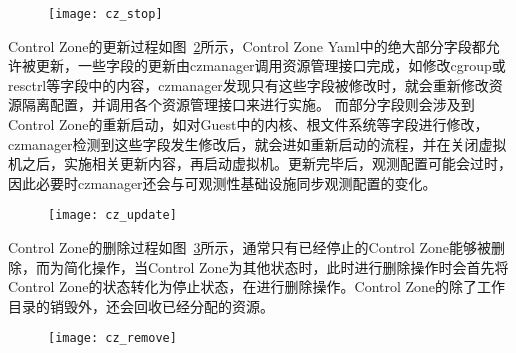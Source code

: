 \begin{figure}[!htbp]
    \centering
    \texttt{[image: cz\_stop]}
    \label{fig:cz_stop}
\end{figure}

Control Zone的更新过程如图~\ref{fig:cz_update}所示，Control Zone Yaml中的绝大部分字段都允许被更新，一些字段的更新由czmanager调用资源管理接口完成，如修改cgroup或resctrl等字段中的内容，czmanager发现只有这些字段被修改时，就会重新修改资源隔离配置，并调用各个资源管理接口来进行实施。 而部分字段则会涉及到Control Zone的重新启动，如对Guest中的内核、根文件系统等字段进行修改，czmanager检测到这些字段发生修改后，就会进如重新启动的流程，并在关闭虚拟机之后，实施相关更新内容，再启动虚拟机。更新完毕后，观测配置可能会过时，因此必要时czmanager还会与可观测性基础设施同步观测配置的变化。

\begin{figure}[!htbp]
    \centering
    \texttt{[image: cz\_update]}
    \label{fig:cz_update}
\end{figure}

Control Zone的删除过程如图~\ref{fig:cz_remove}所示，通常只有已经停止的Control Zone能够被删除，而为简化操作，当Control Zone为其他状态时，此时进行删除操作时会首先将Control Zone的状态转化为停止状态，在进行删除操作。Control Zone的除了工作目录的销毁外，还会回收已经分配的资源。

\begin{figure}[!htbp]
    \centering
    \texttt{[image: cz\_remove]}
    \label{fig:cz_remove}
\end{figure}



